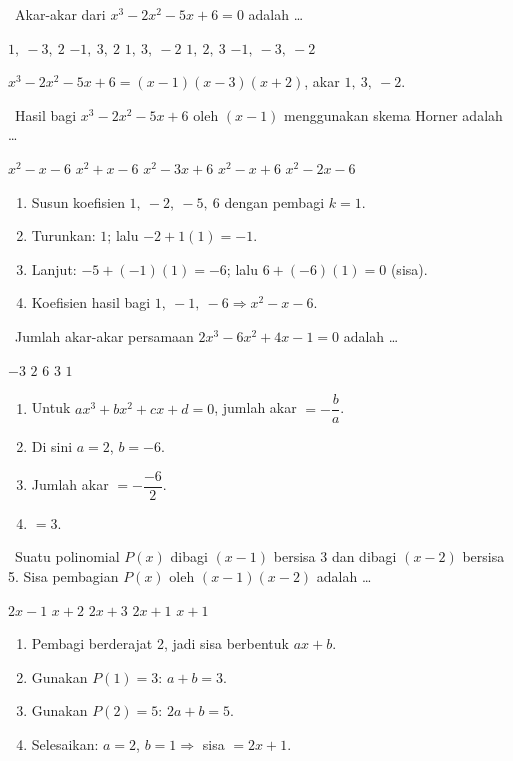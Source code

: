 \documentclass[11pt,a4paper]{exam}
\newenvironment{langkah}{%
  \begin{enumerate}[label=\textbf{Langkah \arabic*:},leftmargin=2.6em,
    itemsep=2pt,topsep=2pt]}{\end{enumerate}}
\newcommand{\Inter}{{\footnotesize\textsf{\textcolor{biru}{[Intermediate]}}}\ }
\newcommand{\Adv}{{\footnotesize\textsf{\textcolor{oranye}{[Advanced]}}}\ }
\begin{document}
\begin{questions}
\question \Inter Akar-akar dari $x^{3}-2x^{2}-5x+6 = 0$ adalah \dots
\begin{choices}
\choice $1,\ -3,\ 2$ \choice $-1,\ 3,\ 2$ \CorrectChoice $1,\ 3,\ -2$
\choice $1,\ 2,\ 3$ \choice $-1,\ -3,\ -2$
\end{choices}
\begin{solution}$x^{3}-2x^{2}-5x+6 = (x-1)(x-3)(x+2)$, akar $1,\ 3,\ -2.$\end{solution}

\question \Adv Hasil bagi $x^{3}-2x^{2}-5x+6$ oleh $(x-1)$ menggunakan skema Horner
adalah \dots
\begin{choices}
\CorrectChoice $x^{2}-x-6$ \choice $x^{2}+x-6$ \choice $x^{2}-3x+6$
\choice $x^{2}-x+6$ \choice $x^{2}-2x-6$
\end{choices}
\begin{solution}
\begin{langkah}
\item Susun koefisien $1,\ -2,\ -5,\ 6$ dengan pembagi $k=1$.
\item Turunkan: $1$; lalu $-2 + 1(1) = -1$.
\item Lanjut: $-5 + (-1)(1) = -6$; lalu $6 + (-6)(1) = 0$ (sisa).
\item Koefisien hasil bagi $1,\ -1,\ -6 \Rightarrow x^{2}-x-6$.
\end{langkah}
\end{solution}

\question \Adv Jumlah akar-akar persamaan $2x^{3}-6x^{2}+4x-1 = 0$ adalah \dots
\begin{choices}
\choice $-3$ \choice $2$ \choice $6$ \CorrectChoice $3$ \choice $1$
\end{choices}
\begin{solution}
\begin{langkah}
\item Untuk $ax^{3}+bx^{2}+cx+d=0$, jumlah akar $= -\dfrac{b}{a}$.
\item Di sini $a=2$, $b=-6$.
\item Jumlah akar $= -\dfrac{-6}{2}$.
\item $= 3$.
\end{langkah}
\end{solution}

\question \Adv Suatu polinomial $P(x)$ dibagi $(x-1)$ bersisa 3 dan dibagi $(x-2)$
bersisa 5. Sisa pembagian $P(x)$ oleh $(x-1)(x-2)$ adalah \dots
\begin{choices}
\choice $2x-1$ \choice $x+2$ \choice $2x+3$ \CorrectChoice $2x+1$ \choice $x+1$
\end{choices}
\begin{solution}
\begin{langkah}
\item Pembagi berderajat 2, jadi sisa berbentuk $ax+b$.
\item Gunakan $P(1)=3$: $a+b = 3$.
\item Gunakan $P(2)=5$: $2a+b = 5$.
\item Selesaikan: $a = 2$, $b = 1 \Rightarrow$ sisa $= 2x+1$.
\end{langkah}
\end{solution}


\end{questions}
\end{document}
